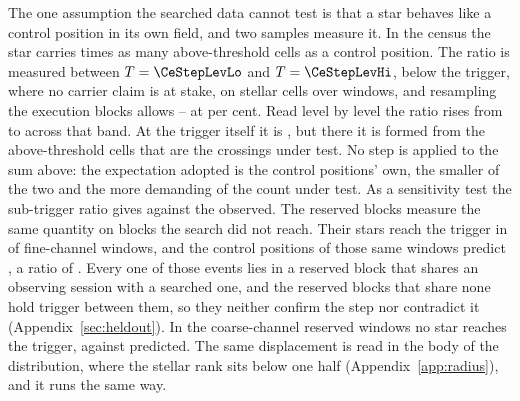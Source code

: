 The one assumption the searched data cannot test is that a star behaves like
a control position in its own field, and two samples measure it. In the census
the star carries \CeStep{} times as many above-threshold cells as a control
position. The ratio is measured between $T=\CeStepLevLo$ and
$T=\CeStepLevHi$, below the trigger, where no carrier claim is at stake, on
\CeStepNStar{} stellar cells over \CeStepNWin{} windows, and resampling the
execution blocks allows \CeStepLo--\CeStepHi{} at \CeCovPct{} per cent.
Read level by level the ratio rises from \CkRatioLo{} to \CkRatioHi{}
across that band. At the trigger itself it is \CeTrAt, but there it is formed
from the \CeStepNX{} above-threshold cells that are the crossings under test.
No step is applied to the sum above: the expectation adopted is the control
positions' own, the smaller of the two and the more demanding of the count
under test. As a sensitivity test the sub-trigger ratio gives \CeExpX{}
against the \CeObs{} observed. The reserved blocks measure
the same quantity on blocks the search did not reach. Their stars reach the
trigger in \StHoObs{} of \StHoNFine{} fine-channel windows, and the control
positions of those same windows predict \StHoExpFine, a ratio of
\StHoRatio. Every one of those
events lies in a reserved block that shares an observing session with a
searched one, and the \HsIndBlocks{} reserved blocks that share none hold
\HsIndObsWord{} trigger \HsIndObsNoun{} between them, so they neither confirm
the step nor contradict it (Appendix~\ref{sec:heldout}). In the \StHoNCoarse{} coarse-channel
reserved windows no star reaches the trigger, against \StHoExpCoarse{}
predicted. The same displacement is read in the body of the distribution,
where the stellar rank sits below one half (Appendix~\ref{app:radius}), and it
runs the same way.

